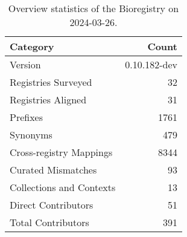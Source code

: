 \begin{table}
\caption{Overview statistics of the Bioregistry on 2024-03-26.}
\label{tab:bioregistry-summary}
\begin{tabular}{lr}
\toprule
Category & Count \\
\midrule
Version & 0.10.182-dev \\
Registries Surveyed & 32 \\
Registries Aligned & 31 \\
Prefixes & 1761 \\
Synonyms & 479 \\
Cross-registry Mappings & 8344 \\
Curated Mismatches & 93 \\
Collections and Contexts & 13 \\
Direct Contributors & 51 \\
Total Contributors & 391 \\
\bottomrule
\end{tabular}
\end{table}
